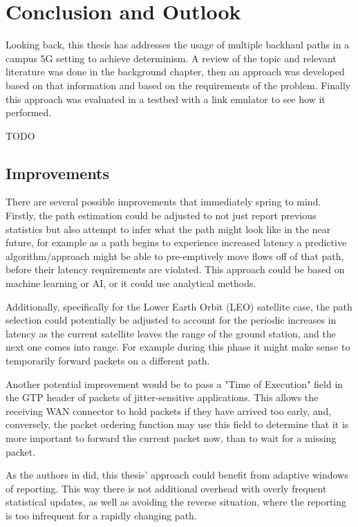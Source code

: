
\cleardoublepage
\chapter{Conclusion and Outlook}
\label{cha:conclusion}

Looking back, this thesis has addresses the usage of multiple backhaul paths in a campus 5G setting to achieve determinism. A review of the topic and relevant literature was done in the background chapter, then an approach was developed based on that information and based on the requirements of the problem. Finally this approach was evaluated in a testbed with a link emulator to see how it performed.

TODO

\section{Improvements}
\label{sec:improvements}

There are several possible improvements that immediately spring to mind. Firstly, the path estimation could be adjusted to not just report previous statistics but also attempt to infer what the path might look like in the near future, for example as a path begins to experience increased latency a predictive algorithm/approach might be able to pre-emptively move flows off of that path, before their latency requirements are violated. This approach could be based on machine learning or AI, or it could use analytical methods.

Additionally, specifically for the Lower Earth Orbit (LEO) satellite case, the path selection could potentially be adjusted to account for the periodic increases in latency as the current satellite leaves the range of the ground station, and the next one comes into range. For example during this phase it might make sense to temporarily forward packets on a different path.

Another potential improvement would be to pass a "Time of Execution" field in the GTP header of packets of jitter-sensitive applications. This allows the receiving WAN connector to hold packets if they have arrived too early, and, conversely, the packet ordering function may use this field to determine that it is more important to forward the current packet now, than to wait for a missing packet.

As the authors in \cite{adaptive} did, this thesis' approach could benefit from adaptive windows of reporting. This way there is not additional overhead with overly frequent statistical updates, as well as avoiding the reverse situation, where the reporting is too infrequent for a rapidly changing path.

